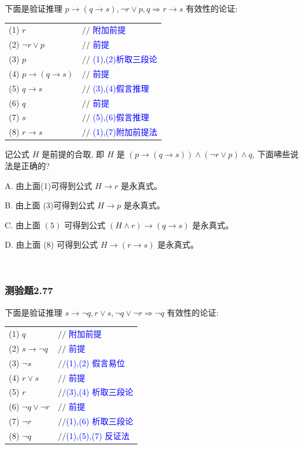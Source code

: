 \documentclass[UTF8, heading=true]{ctexart}
\begin{document}
下面是验证推理 $p \rightarrow(q \rightarrow s), \neg r \vee p, q \Longrightarrow r \rightarrow s$ 有效性的论证:

\begin{table}[H]
  \centering
  \renewcommand{\arraystretch}{1.8}
\begin{tabular}{ll} 
(1) $r$ & $/ /$ \textcolor{blue}{附加前提} \\
(2) $\neg r \vee p$ & $/ /$ \textcolor{blue}{前提} \\
(3) $p$ & $/ /$ \textcolor{blue}{(1),(2)析取三段论} \\
(4) $p \rightarrow(q \rightarrow s)$ & $/ /$ \textcolor{blue}{前提} \\
(5) $q \rightarrow s$ & $/ /$ \textcolor{blue}{(3),(4)假言推理} \\
(6) $q$ & $/ /$ \textcolor{blue}{前提} \\
(7) $s$ & $/ /$ \textcolor{blue}{(5),(6)假言推理} \\
(8) $r \rightarrow s$ & $/ /$ \textcolor{blue}{(1),(7)附加前提法}
\end{tabular}
\end{table}

记公式 $H$ 是前提的合取, 即 $H$ 是 $(p \rightarrow(q \rightarrow s)) \wedge(\neg r \vee p) \wedge q$, 下面咈些说法是正确的?

A. 由上面(1)可得到公式 $H \rightarrow r$ 是永真式。

B. 由上面 (3)可得到公式 $H \rightarrow p$ 是永真式。

C. 由上面 $(5)$ 可得到公式 $(H \wedge r) \rightarrow(q \rightarrow s)$ 是永真式。

D. 由上面 (8) 可得到公式 $H \rightarrow(r \rightarrow s)$ 是永真式。

\textcolor{white}{答案：CD}

\subsubsection{测验题2.77}

下面是验证推理 $s \rightarrow \neg q, r \vee s, \neg q \vee \neg r \Longrightarrow \neg q$ 有效性的论证:


\clearpage

\begin{table}[H]
  \centering
  \renewcommand{\arraystretch}{1.5}
\begin{tabular}{ll} 
(1) $q$ & $/ /$ \textcolor{blue}{附加前提} \\
(2) $s \rightarrow \neg q$ & $/ /$ \textcolor{blue}{前提} \\
(3) $\neg s$ & $/ /$\textcolor{blue}{(1),(2) 假言易位} \\
(4) $r \vee s$ & $/ /$ \textcolor{blue}{前提} \\
(5) $r$ & $/ /$\textcolor{blue}{(3),(4) 析取三段论} \\
(6) $\neg q \vee \neg r$ & $/ /$ \textcolor{blue}{前提} \\
(7) $\neg r$ & $/ /$\textcolor{blue}{(1),(6) 析取三段论} \\
(8) $\neg q$ & $/ /$\textcolor{blue}{(1),(5),(7) 反证法}
\end{tabular}
\end{table}
\end{document}
